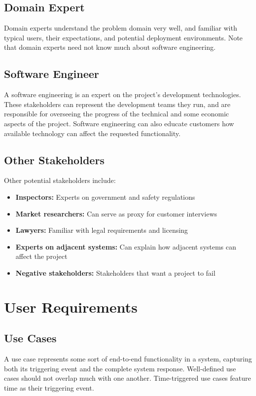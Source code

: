 \documentclass[12pt,titlepage]{article}
\begin{document}
    \subsection{Domain Expert}
      Domain experts understand the problem domain very well, and familiar with typical users, their expectations, and potential deployment environments.
      Note that domain experts need not know much about software engineering.

    \subsection{Software Engineer}
      A software engineering is an expert on the project's development technologies. These stakeholders can represent the development teams they run, and
      are responsible for overseeing the progress of the technical and some economic aspects of the project. Software engineering can also educate customers
      how available technology can affect the requested functionality.

    \subsection{Other Stakeholders}
      Other potential stakeholders include:
      \begin{itemize}
        \item \textbf{Inspectors:} Experts on government and safety regulations
        \item \textbf{Market researchers:} Can serve as proxy for customer interviews
        \item \textbf{Lawyers:} Familiar with legal requirements and licensing
        \item \textbf{Experts on adjacent systems:} Can explain how adjacent systems can affect the project
        \item \textbf{Negative stakeholders:} Stakeholders that want a project to fail
      \end{itemize}

  \newpage

  \section{User Requirements}

    \subsection{Use Cases}
      A use case represents some sort of end-to-end functionality in a system, capturing both its triggering event and the complete system response. Well-defined
      use cases should not overlap much with one another. Time-triggered use cases feature time as their triggering event.
\end{document}
